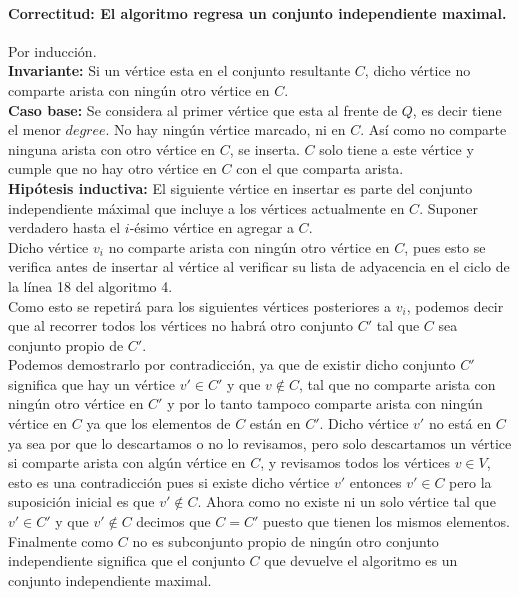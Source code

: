 \documentclass[12pt]{article}
\begin{document}
\paragraph{Correctitud: El algoritmo regresa un conjunto independiente maximal.}
Por inducción.\\
\textbf{Invariante: } Si un vértice esta en el conjunto resultante $C$, dicho vértice no comparte arista con ningún otro vértice en $C$.\\
\textbf{Caso base:} Se considera al primer vértice que esta al frente de $Q$, es decir tiene el menor $degree$. No hay ningún vértice marcado, ni en $C$. Así como no comparte ninguna arista con otro vértice en $C$, se inserta. $C$ solo tiene a este vértice y cumple que no hay otro vértice en $C$ con el que comparta arista.\\
\textbf{Hipótesis inductiva:} El siguiente vértice en insertar es parte del conjunto independiente máximal que incluye a los vértices actualmente en $C$.
Suponer verdadero hasta el $i$-ésimo vértice en agregar a $C$.\\
Dicho vértice $v_i$ no comparte arista con ningún otro vértice en $C$, pues esto se verifica antes de insertar al vértice al verificar su lista de adyacencia en el ciclo de la línea 18 del algoritmo 4. \\
Como esto se repetirá para los siguientes vértices posteriores a $v_i$, podemos decir que al recorrer todos los vértices no habrá otro conjunto $C'$ tal que $C$ sea conjunto propio de $C'$. \\
Podemos demostrarlo por contradicción, ya que de existir dicho conjunto $C'$ significa que hay un vértice $v'\in C'$ y que $v\notin C$, tal que no comparte arista con ningún otro vértice en $C'$ y por lo tanto tampoco comparte arista con ningún vértice en $C$ ya que los elementos de $C$ están en $C'$. Dicho vértice $v'$ no está en $C$ ya sea por que lo descartamos o no lo revisamos, pero solo descartamos un vértice si comparte arista con algún vértice en $C$, y revisamos todos los vértices $v\in V$, esto es una contradicción pues si existe dicho vértice $v'$ entonces $v'\in C$ pero la suposición inicial es que $v'\notin C$. Ahora como no existe ni un solo vértice tal que $v'\in C'$ y que $v'\notin C$ decimos que $C=C'$ puesto que tienen los mismos elementos. Finalmente como $C$ no es subconjunto propio de ningún otro conjunto independiente significa que el conjunto $C$ que devuelve el algoritmo es un conjunto independiente maximal.
\end{document}
